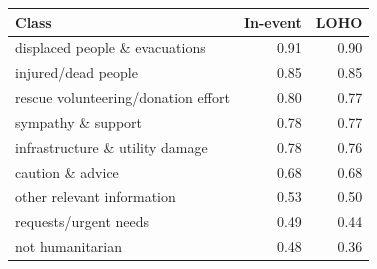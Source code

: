 \begin{tabular}{lrr}
\toprule
Class & In-event & LOHO \\
\midrule
displaced people \& evacuations & 0.91 & 0.90 \\
injured/dead people & 0.85 & 0.85 \\
rescue volunteering/donation effort & 0.80 & 0.77 \\
sympathy \& support & 0.78 & 0.77 \\
infrastructure \& utility damage & 0.78 & 0.76 \\
caution \& advice & 0.68 & 0.68 \\
other relevant information & 0.53 & 0.50 \\
requests/urgent needs & 0.49 & 0.44 \\
not humanitarian & 0.48 & 0.36 \\
\bottomrule
\end{tabular}
